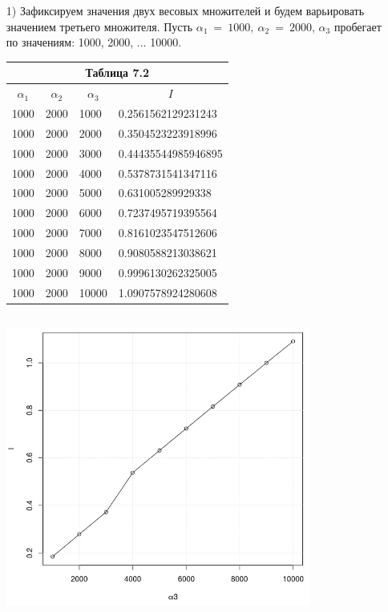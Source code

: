 \documentclass[14pt]{extreport}
\begin{document}
\begin{itemize}
\item[1)]  Зафиксируем значения двух весовых множителей и будем варьировать значением третьего множителя.
Пусть $\alpha_1\ =\ 1000,\ \alpha_2\ =\ 2000$, $\alpha_3$ пробегает по значениям: 1000, 2000, ... 10000.

\begin{center}
   \begin{tabular}{ |l|l|l|l| }
   \multicolumn{4}{c}{Таблица 7.2}\\
    \hline
    \multicolumn{1}{|c|}{$\alpha_1$} & \multicolumn{1}{c|}{$\alpha_2$} & \multicolumn{1}{c|}{$\alpha_3$} & \multicolumn{1}{c|}{$I$} \\ \hline
    1000 & 2000 & 1000 & 0.2561562129231243  \\ \hline
    1000 & 2000 & 2000 & 0.3504523223918996  \\ \hline
    1000 & 2000 & 3000 & 0.44435544985946895  \\ \hline
    1000 & 2000 & 4000 & 0.5378731541347116  \\ \hline
    1000 & 2000 & 5000 & 0.631005289929338  \\ \hline
    1000 & 2000 & 6000 & 0.7237495719395564  \\ \hline
    1000 & 2000 & 7000 & 0.8161023547512606  \\ \hline
    1000 & 2000 & 8000 & 0.9080588213038621  \\ \hline
    1000 & 2000 & 9000 & 0.9996130262325005  \\ \hline
    1000 & 2000 & 10000 & 1.0907578924280608  \\ \hline
  \end{tabular}             
\end{center}

\begin{center}
\includegraphics[width=10cm, height=10cm]{laa1.png}


\end{center}
\end{itemize}
\end{document}
